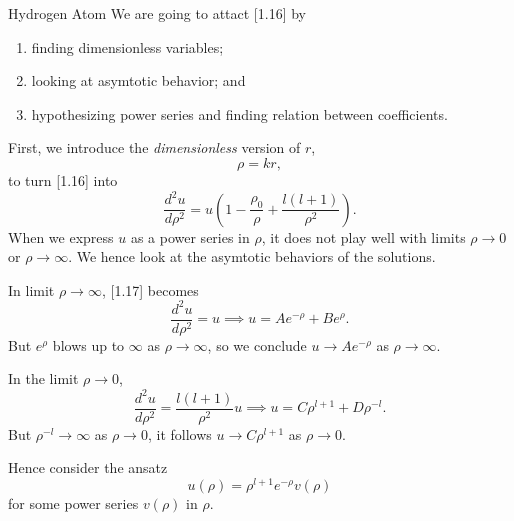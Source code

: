 \documentclass[phys334]{subfiles}
\begin{document}
\begin{example}{Hydrogen Atom}
        We are going to attact [1.16] by
        \begin{enumerate}
            \item finding dimensionless variables;
            \item looking at asymtotic behavior; and
            \item hypothesizing power series and finding relation between coefficients.
        \end{enumerate}
        First, we introduce the \textit{dimensionless} version of $r$,
        \begin{equation*}
            \rho = kr,
        \end{equation*}
        to turn [1.16] into
        \begin{equation}
            \frac{d^{2}u}{d\rho^{2}} = u\left( 1-\frac{\rho_0}{\rho}+\frac{l\left( l+1 \right)}{\rho^{2}} \right).
        \end{equation}
        When we express $u$ as a power series in $\rho$, it does not play well with limits $\rho\to 0$ or $\rho\to\infty$. We hence look at the asymtotic behaviors of the solutions.

        In limit $\rho\to\infty$, [1.17] becomes
        \begin{equation*}
            \frac{d^{2}u}{d\rho^{2}} = u \implies u = Ae^{-\rho} + Be^{\rho}.
        \end{equation*}
        But $e^{\rho}$ blows up to $\infty$ as $\rho\to\infty$, so we conclude $u\to Ae^{-\rho}$ as $\rho\to\infty$.

        In the limit $\rho\to 0$,
        \begin{equation*}
            \frac{d^{2}u}{d\rho^{2}} = \frac{l\left( l+1 \right)}{\rho^{2}}u \implies u = C\rho^{l+1} + D\rho^{-l}.
        \end{equation*}
        But $\rho^{-l}\to\infty$ as $\rho\to 0$, it follows $u\to C\rho^{l+1}$ as $\rho\to 0$.

        Hence consider the ansatz
        \begin{equation*}
            u\left( \rho \right) = \rho^{l+1}e^{-\rho}v\left( \rho \right)
        \end{equation*}
        for some power series $v\left( \rho \right)$ in $\rho$.


\end{example}
\end{document}
